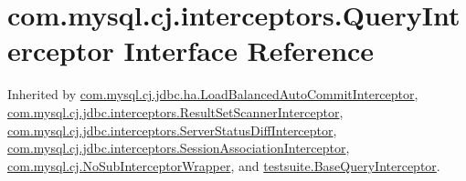 \hypertarget{interfacecom_1_1mysql_1_1cj_1_1interceptors_1_1_query_interceptor}{}\section{com.\+mysql.\+cj.\+interceptors.\+Query\+Interceptor Interface Reference}
\label{interfacecom_1_1mysql_1_1cj_1_1interceptors_1_1_query_interceptor}


Inherited by \mbox{\hyperlink{classcom_1_1mysql_1_1cj_1_1jdbc_1_1ha_1_1_load_balanced_auto_commit_interceptor}{com.\+mysql.\+cj.\+jdbc.\+ha.\+Load\+Balanced\+Auto\+Commit\+Interceptor}}, \mbox{\hyperlink{classcom_1_1mysql_1_1cj_1_1jdbc_1_1interceptors_1_1_result_set_scanner_interceptor}{com.\+mysql.\+cj.\+jdbc.\+interceptors.\+Result\+Set\+Scanner\+Interceptor}}, \mbox{\hyperlink{classcom_1_1mysql_1_1cj_1_1jdbc_1_1interceptors_1_1_server_status_diff_interceptor}{com.\+mysql.\+cj.\+jdbc.\+interceptors.\+Server\+Status\+Diff\+Interceptor}}, \mbox{\hyperlink{classcom_1_1mysql_1_1cj_1_1jdbc_1_1interceptors_1_1_session_association_interceptor}{com.\+mysql.\+cj.\+jdbc.\+interceptors.\+Session\+Association\+Interceptor}}, \mbox{\hyperlink{classcom_1_1mysql_1_1cj_1_1_no_sub_interceptor_wrapper}{com.\+mysql.\+cj.\+No\+Sub\+Interceptor\+Wrapper}}, and \mbox{\hyperlink{classtestsuite_1_1_base_query_interceptor}{testsuite.\+Base\+Query\+Interceptor}}.


